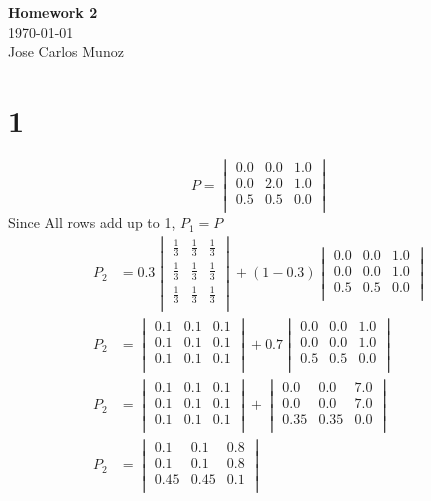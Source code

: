 \documentclass[12pt,english]{article}
\begin{document}
\begin{center}
    \Large
    \textbf{Homework 2}\\
    \small
    \today\\
    \large
    Jose Carlos Munoz
\end{center}
\section*{1}
\begin{equation*}
P =
\begin{vmatrix}
0.0 & 0.0 & 1.0\\
0.0 & 2.0 & 1.0\\
0.5 & 0.5 & 0.0\\
\end{vmatrix}
\end{equation*}
Since All rows add up to 1, $P_1 = P$\\
\begin{align*}
P_2 &=0.3
\begin{vmatrix}
\frac{1}{3} & \frac{1}{3} & \frac{1}{3}\\
\frac{1}{3} & \frac{1}{3} & \frac{1}{3}\\
\frac{1}{3} & \frac{1}{3} & \frac{1}{3}\\
\end{vmatrix}
+ (1-0.3)
\begin{vmatrix}
0.0 & 0.0 & 1.0\\
0.0 & 0.0 & 1.0\\
0.5 & 0.5 & 0.0\\
\end{vmatrix}
\\
P_2 &=
\begin{vmatrix}
0.1 & 0.1 & 0.1\\
0.1 & 0.1 & 0.1\\
0.1 & 0.1 & 0.1\\
\end{vmatrix}
+ 0.7
\begin{vmatrix}
0.0 & 0.0 & 1.0\\
0.0 & 0.0 & 1.0\\
0.5 & 0.5 & 0.0\\
\end{vmatrix}
\\
P_2 &=
\begin{vmatrix}
0.1 & 0.1 & 0.1\\
0.1 & 0.1 & 0.1\\
0.1 & 0.1 & 0.1\\
\end{vmatrix}
+ 
\begin{vmatrix}
0.0 & 0.0 & 7.0\\
0.0 & 0.0 & 7.0\\
0.35 & 0.35 & 0.0\\
\end{vmatrix}
\\
P_2 &=
\begin{vmatrix}
0.1 & 0.1 & 0.8\\
0.1 & 0.1 & 0.8\\
0.45 & 0.45 & 0.1\\
\end{vmatrix}
\end{align*}
\end{document}
